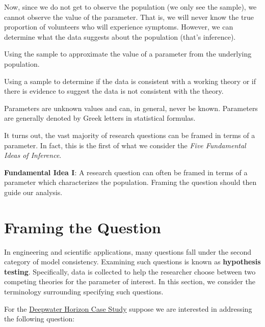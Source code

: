 \documentclass[]{book}
\theoremstyle{definition}
\theoremstyle{definition}
\theoremstyle{remark}
\let\BeginKnitrBlock\begin \let\EndKnitrBlock\end
\begin{document}
Now, since we do not get to observe the population (we only see the
sample), we cannot observe the value of the parameter. That is, we will
never know the true proportion of volunteers who will experience
symptoms. However, we can determine what the data suggests about the
population (that's inference).

\BeginKnitrBlock{definition}[Estimation]
\protect\hypertarget{def:defn-estimation}{}{\label{def:defn-estimation}
{} }Using the sample to approximate the value
of a parameter from the underlying population.
\EndKnitrBlock{definition}

\BeginKnitrBlock{definition}[Hypothesis Testing]
\protect\hypertarget{def:defn-hypothesis-testing}{}{\label{def:defn-hypothesis-testing}
{} }Using a sample to determine if the
data is consistent with a working theory or if there is evidence to
suggest the data is not consistent with the theory.
\EndKnitrBlock{definition}

\BeginKnitrBlock{rmdkeyidea}
Parameters are unknown values and can, in general, never be known.
Parameters are generally denoted by Greek letters in statistical
formulas.
\EndKnitrBlock{rmdkeyidea}

It turns out, the vast majority of research questions can be framed in
terms of a parameter. In fact, this is the first of what we consider the
\emph{Five Fundamental Ideas of Inference}.

\BeginKnitrBlock{rmdfivefund}
\textbf{Fundamental Idea I}: A research question can often be framed in
terms of a parameter which characterizes the population. Framing the
question should then guide our analysis.
\EndKnitrBlock{rmdfivefund}

\section{Framing the Question}\label{framing-the-question}

In engineering and scientific applications, many questions fall under
the second category of model consistency. Examining such questions is
known as \textbf{hypothesis testing}. Specifically, data is collected to
help the researcher choose between two competing theories for the
parameter of interest. In this section, we consider the terminology
surrounding specifying such questions.

For the \protect\hyperlink{CaseDeepwater}{Deepwater Horizon Case Study}
suppose we are interested in addressing the following question:
\end{document}
